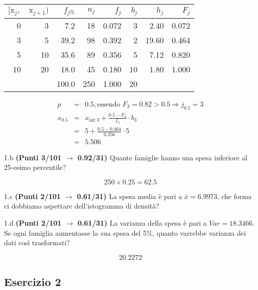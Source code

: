 \documentclass[
  11pt,
]{book}
\theoremstyle{mytheoremstyle}
\theoremstyle{mydefstyle}
\newenvironment{sol}
  {
  \begin{tcolorbox}[enhanced,breakable,arc=0.1mm,boxrule=1pt,colback=white,colframe=iblue,
  title=\bf \fontfamily{lmss}\selectfont \hspace{.5 cm} Soluzione,drop fuzzy shadow]

}{
\end{tcolorbox}
  }
\begin{document}
\begin{sol}

\begin{table}[H]
\centering
\begin{tabular}{rrrrrrrr}
\toprule
$[\text{x}_j,$ & $\text{x}_{j+1})$ & $f_{j\%}$ & $n_j$ & $f_j$ & $b_j$ & $h_j$ & $F_j$\\
\midrule
0 & 3 & 7.2 & 18 & 0.072 & 3 & 2.40 & 0.072\\
3 & 5 & 39.2 & 98 & 0.392 & 2 & 19.60 & 0.464\\
5 & 10 & 35.6 & 89 & 0.356 & 5 & 7.12 & 0.820\\
10 & 20 & 18.0 & 45 & 0.180 & 10 & 1.80 & 1.000\\
 &  & 100.0 & 250 & 1.000 & 20 &  & \\
\bottomrule
\end{tabular}
\end{table}

\begin{eqnarray*}
  p &=&  0.5 , \text{essendo }F_{ 3 }= 0.82  > 0.5  \Rightarrow j_{ 0.5 }= 3 \\
  x_{ 0.5 } &=& x_{\text{inf}; 3 } + \frac{ { 0.5 } - F_{ 2 }} {f_{ 3 }} \cdot b_{ 3 } \\
            &=&  5  + \frac {{ 0.5 } -  0.464 } { 0.356 } \cdot  5  \\
            &=&  5.506 
\end{eqnarray*}

\end{sol}

1.b \textbf{(Punti 3/101 \(\rightarrow\) 0.92/31)} Quante famiglie hanno una spesa inferiore al 25-esimo percentile?

\begin{sol}
\[
250\times 0.25=62.5
\]

\end{sol}

1.c \textbf{(Punti 2/101 \(\rightarrow\) 0.61/31)} La spesa media è pari a \(\bar x=6.9973\), che forma ci dobbiamo aspettare dell'istogramma di densità?

1.d \textbf{(Punti 2/101 \(\rightarrow\) 0.61/31)} La varianza della spesa è pari a \(Var=18.3466\).
Se ogni famiglia aumentasse la sua spesa del 5\%, quanto varrebbe varianza dei dati così trasformati?

\begin{sol}
\[20.2272\]

\end{sol}

\subsection{Esercizio 2}\label{esercizio-2-12}
\end{document}
